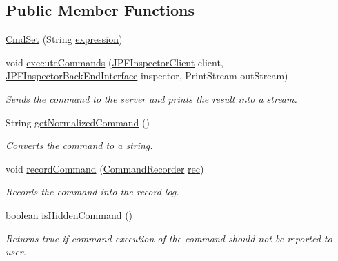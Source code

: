 \subsection*{Public Member Functions}
\begin{DoxyCompactItemize}
\item 
\hyperlink{classgov_1_1nasa_1_1jpf_1_1inspector_1_1client_1_1commands_1_1_cmd_set_ac8a42a984d789ec0d9b02d586e4ebe0a}{Cmd\+Set} (String \hyperlink{classgov_1_1nasa_1_1jpf_1_1inspector_1_1client_1_1commands_1_1_cmd_set_aed86c1fec85487f1a1a4ba772aa260bd}{expression})
\item 
void \hyperlink{classgov_1_1nasa_1_1jpf_1_1inspector_1_1client_1_1commands_1_1_cmd_set_af38f6d129a5b40e09c00d2e439ea6c9d}{execute\+Commands} (\hyperlink{classgov_1_1nasa_1_1jpf_1_1inspector_1_1client_1_1_j_p_f_inspector_client}{J\+P\+F\+Inspector\+Client} client, \hyperlink{interfacegov_1_1nasa_1_1jpf_1_1inspector_1_1interfaces_1_1_j_p_f_inspector_back_end_interface}{J\+P\+F\+Inspector\+Back\+End\+Interface} inspector, Print\+Stream out\+Stream)
\begin{DoxyCompactList}\small\item\em Sends the command to the server and prints the result into a stream. \end{DoxyCompactList}\item 
String \hyperlink{classgov_1_1nasa_1_1jpf_1_1inspector_1_1client_1_1commands_1_1_cmd_set_abff88716bb353e748b3fc879539ef8f8}{get\+Normalized\+Command} ()
\begin{DoxyCompactList}\small\item\em Converts the command to a string. \end{DoxyCompactList}\item 
void \hyperlink{classgov_1_1nasa_1_1jpf_1_1inspector_1_1client_1_1_client_command_ae0670332ec750bc5b9016d0b04d8adfe}{record\+Command} (\hyperlink{classgov_1_1nasa_1_1jpf_1_1inspector_1_1client_1_1_command_recorder}{Command\+Recorder} \hyperlink{classgov_1_1nasa_1_1jpf_1_1inspector_1_1client_1_1_client_command_af4246f2427035c72a6af45a2c61361f7}{rec})
\begin{DoxyCompactList}\small\item\em Records the command into the record log. \end{DoxyCompactList}\item 
boolean \hyperlink{classgov_1_1nasa_1_1jpf_1_1inspector_1_1client_1_1_client_command_afb09c400c64e2d8e01059b91ff847761}{is\+Hidden\+Command} ()
\begin{DoxyCompactList}\small\item\em Returns true if command execution of the command should not be reported to user. \end{DoxyCompactList}\end{DoxyCompactItemize}
